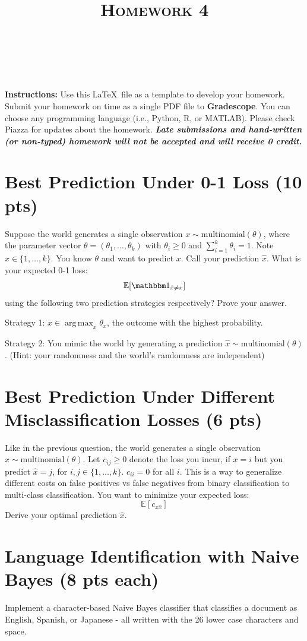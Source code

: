 \documentclass[letter]{article}
\title{\textsc{Homework 4}} %
\author{
\red{$>>$NAME HERE$<<$} \\
\red{$>>$ID HERE$<<$}\\
}
\date{}
\theoremstyle{definition}
\DeclareMathOperator*{\argmax}{arg\,max}
\def\E{\mathbb E}
\def\ind{\mathbbm 1}
\begin{document}
\maketitle 


\textbf{Instructions:} Use this \LaTeX~file as a template to develop your homework. Submit your homework on time as a single PDF file to \textbf{Gradescope}. You can choose any programming language (i.e., Python, R, or MATLAB). Please check Piazza for updates about the homework. \textbf{\em Late submissions and hand-written (or non-typed) homework will not be accepted and will receive 0 credit.}

\section{Best Prediction Under 0-1 Loss (10 pts)}
Suppose the world generates a single observation $x \sim \mbox{multinomial}(\theta)$, where the parameter vector $\theta=(\theta_1, \ldots, \theta_k)$ with $\theta_i\ge 0$ and $\sum_{i=1}^k \theta_i=1$.  Note $x \in \{1, \ldots, k\}$.
You know $\theta$ and want to predict $x$. 
Call your prediction $\hat x$.  What is your expected 0-1 loss: 
$$\E[\ind_{\hat x \neq x}]$$
using the following two prediction strategies respectively?  Prove your answer.


Strategy 1: $\hat x \in \argmax_x \theta_x$, the outcome with the highest probability.

Strategy 2: You mimic the world by generating a prediction $\hat x \sim \mbox{multinomial}(\theta)$.  (Hint: your randomness and the world's randomness are independent)


\section{Best Prediction Under Different Misclassification Losses (6 pts)}
Like in the previous question, 
the world generates a single observation $x \sim \mbox{multinomial}(\theta)$.
Let $c_{ij} \ge 0$ denote the loss you incur, if $x=i$ but you predict $\hat x=j$, for $i,j \in \{1, \ldots, k\}$.
$c_{ii}=0$ for all $i$.
This is a way to generalize different costs on false positives vs false negatives from binary classification to multi-class classification.
You want to minimize your expected loss:
$$\E[c_{x \hat x}]$$
Derive your optimal prediction $\hat x$.


\section{Language Identification with Naive Bayes (8 pts each)}
Implement a character-based Naive Bayes classifier that classifies a document as English, Spanish, or Japanese - all written with the 26 lower case characters and space.
\end{document}
